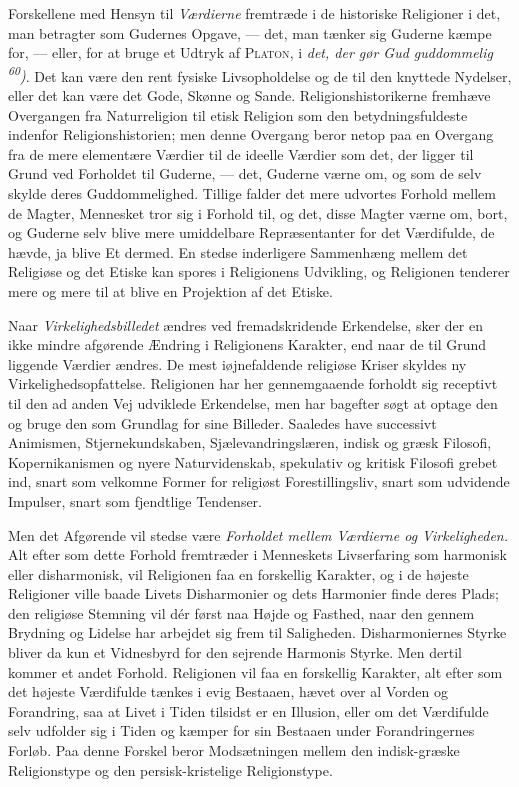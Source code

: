\documentclass[12pt,a4paper,openany]{book}
\newcommand{\opage}[1]{\marginnote{\footnotesize\textit{[#1]}}}
\begin{document}
Forskellene med Hensyn til \textit{Værdierne} fremtræde i de historiske
Religioner i det, man betragter som Gudernes Opgave, --- det, man tænker sig
Guderne kæmpe for, --- eller, for at bruge et Udtryk af \textsc{Platon}, i
\textit{det, der gør Gud guddommelig} \textit{\textsuperscript{60})}. Det kan
være den rent fysiske Livsopholdelse og de til den knyttede Nydelser, eller det
kan være det Gode, Skønne og Sande. Religionshistorikerne fremhæve Overgangen
fra Naturreligion til etisk Religion som den betydningsfuldeste indenfor
Religionshistorien; men denne Overgang beror netop paa en Overgang fra de mere
elementære Værdier til de ideelle Værdier som det, der ligger til Grund ved
Forholdet til Guderne, --- det, Guderne værne om, og som de selv skylde deres
Guddommelighed. Tillige falder det mere udvortes Forhold mellem de Magter,
Mennesket tror sig i Forhold til, og det, disse Magter værne om, bort, og
Guderne selv blive mere umiddelbare Repræsentanter for det Værdifulde, de
hævde, ja blive Et dermed. En stedse inderligere Sammenhæng mellem det
Religiøse og det Etiske kan spores i Religionens Udvikling, og Religionen
tenderer mere og mere til at blive en Projektion af det Etiske.

\opage{83}Naar \textit{Virkelighedsbilledet} ændres ved fremadskridende
Erkendelse, sker der en ikke mindre afgørende Ændring i Religionens Karakter,
end naar de til Grund liggende Værdier ændres. De mest iøjnefaldende religiøse
Kriser skyldes ny Virkelighedsopfattelse. Religionen har her gennemgaaende
forholdt sig receptivt til den ad anden Vej udviklede Erkendelse, men har
bagefter søgt at optage den og bruge den som Grundlag for sine Billeder.
Saaledes have successivt Animismen, Stjernekundskaben, Sjælevandringslæren,
indisk og græsk Filosofi, Kopernikanismen og nyere Naturvidenskab, spekulativ
og kritisk Filosofi grebet ind, snart som velkomne Former for religiøst
Forestillingsliv, snart som udvidende Impulser, snart som fjendtlige Tendenser.

Men det Afgørende vil stedse være \textit{Forholdet mellem Værdierne og
Virkeligheden.} Alt efter som dette Forhold fremtræder i Menneskets
Livserfaring som harmonisk eller disharmonisk, vil Religionen faa en forskellig
Karakter, og i de højeste Religioner ville baade Livets Disharmonier og dets
Harmonier finde deres Plads; den religiøse Stemning vil dér først naa Højde og
Fasthed, naar den gennem Brydning og Lidelse har arbejdet sig frem til
Saligheden. Disharmoniernes Styrke bliver da kun et Vidnesbyrd for den sejrende
Harmonis Styrke. Men dertil kommer et andet Forhold. Religionen vil faa en
forskellig Karakter, alt efter som det højeste Værdifulde tænkes i evig
Bestaaen, hævet over al Vorden og Forandring, saa at Livet i Tiden tilsidst er
en Illusion, eller om det Værdifulde selv udfolder sig i Tiden og kæmper for
sin Bestaaen under Forandringernes Forløb. Paa denne Forskel beror Modsætningen
mellem den indisk-græske Religionstype og den persisk-kristelige Religionstype.
\end{document}
